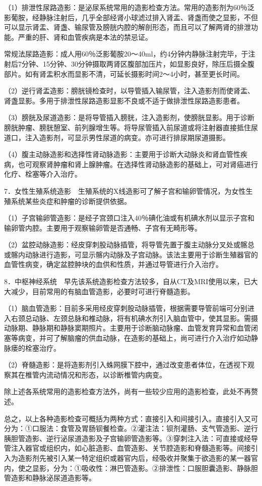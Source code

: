 （1）排泄性尿路造影：是泌尿系统常用的造影检查方法。常用的造影剂为60％泛影葡胺，经静脉注射后，几乎全部经肾小球滤过排入肾盂、肾盏而使之显影，不但可以显示肾盂、肾盏、输尿管及膀胱内腔的解剖形态，而且可以了解两肾的排泄功能。严重的肝、肾和血管疾病是本法的禁忌证。

常规法尿路造影：成人用60％泛影葡胺20～40ml，约4分钟内静脉注射完毕，于注射后7分钟、15分钟、30分钟摄取两肾区腹部加压片，如显影良好，除压后摄全腹部片。如有肾盂积水而显影不清，可延长摄影时间2～4小时，甚至更长时间。

（2）逆行肾盂造影：膀胱镜检查时，以导管插入输尿管，注入造影剂而使肾盂、肾盏显影。多用于排泄性尿路造影显影不良或不适于做排泄性尿路造影患者。

（3）膀胱及尿道造影：是将导管插入膀胱，注入造影剂，使膀胱显影。用于诊断膀胱肿瘤、膀胱憩室、前列腺增生等。将导尿管插入前尿道或将注射器直接抵住尿道口，注入造影剂，可显示男性尿道的病变。亦可进行排尿期尿道摄影。

（4）腹主动脉造影和选择性肾动脉造影：主要用于诊断大动脉炎和肾血管性疾病，也可观察肾肿瘤和肾上腺肿瘤。在选择性肾动脉造影的基础上，可对肾癌进行化疗、栓塞等介入治疗。

7．女性生殖系统造影　生殖系统的X线造影可了解子宫和输卵管情况，为女性生殖系统某些炎症和肿瘤的诊断提供依据。

（1）子宫输卵管造影：是经子宫颈口注入40％碘化油或有机碘水剂以显示子宫和输卵管内腔。主要用于观察输卵管是否通畅、子宫有无畸形等。

（2）盆腔动脉造影：经皮穿刺股动脉插管，将导管先置于腹主动脉分叉处或髂总或髂内动脉进行造影，可显示髂内动脉及子宫动脉。该法主要用于诊断生殖器官的血管性病变，确定盆腔肿块的血供和性质，并通过导管进行介入治疗。

8．中枢神经系统　早先该系统造影检查方法较多，自从CT及MRI使用以来，已大大减少，目前常用的有脑血管造影，必要时可进行脊髓造影。

（1）脑血管造影：目前多采用经皮穿刺股动脉插管，根据需要导管前端可分别进入右颈总动脉、左颈总脉和椎动脉，将有机碘水剂引入脑血管中，使其显影。需摄动脉期、静脉期和静脉窦期照片。主要用于诊断脑动脉瘤、血管发育异常和血管闭塞等病变，并可了解脑瘤的供血动脉，在造影的基础上，尚可进行介入治疗如动静脉瘘的栓塞治疗。

（2）脊髓造影：是将造影剂引入蛛网膜下腔中，通过改变患者体位，在透视下观察其在椎管内流动情况和形态，以诊断椎管内病变。

除上述各系统常用的造影检查方法外，尚有一些较少应用的造影检查，此处不再赘述。

总之，以上各种造影检查可概括为两种方式：直接引入和间接引入。直接引入又可分为：①口服法：食管及胃肠钡餐检查。②灌注法：钡剂灌肠、支气管造影、逆行胰胆管造影、逆行泌尿道造影及子宫输卵管造影等。③穿刺注入法：可直接或经导管注入器官或组织内，如心脏造影、血管造影、关节腔造影和脊髓造影等。间接引入为造影剂先被引入某一特定组织或器官内后，经吸收并聚集于欲造影的某一器官内，使之显影，分为：①吸收性：淋巴管造影。②排泄性：口服胆囊造影、静脉胆管造影和静脉泌尿道造影等。

